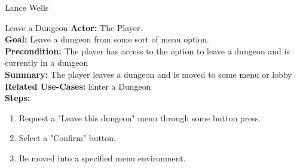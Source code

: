 \documentclass[12pt]{report}
\begin{document}
\begin{section}{Lance Wells}
\begin{subsection}{Leave a Dungeon}
\textbf{Actor:} The Player. \\
\textbf{Goal:} Leave a dungeon from some sort of menu option. \\
\textbf{Precondition:} The player has access to the option to leave a dungeon and is currently in a dungeon \\
\textbf{Summary:} The player leaves a dungeon and is moved to some menu or lobby \\
\textbf{Related Use-Cases:} Enter a Dungeon \\
\textbf{Steps:}
\begin{enumerate}
	\item Request a "Leave this dungeon" menu through some button press.
	\item Select a "Confirm" button.
	\item Be moved into a specified menu environment.
\end{enumerate}
\end{subsection}

\end{section}
\end{document}

